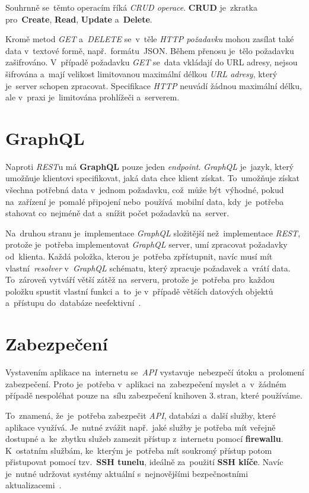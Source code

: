 \documentclass[11pt,a4paper]{report}
\begin{document}
            Souhrnně se~těmto operacím říká \emph{CRUD operace}. \textbf{CRUD} je~zkratka pro~\textbf{Create}, \textbf{Read}, \textbf{Update} a~\textbf{Delete}.

            Kromě metod \emph{GET} a~\emph{DELETE} se~v~těle \emph{HTTP požadavku} mohou zasílat také data v~textové formě, např.~formátu~JSON. Během přenosu je~tělo požadavku zašifrováno. V~případě požadavku \emph{GET} se~data vkládají do URL adresy, nejsou šifrována a~mají velikost limitovanou maximální délkou \emph{URL adresy}, který je~server schopen zpracovat. Specifikace \emph{HTTP} neuvádí žádnou maximální délku, ale v~praxi je~limitována prohlížeči a~serverem. \cite[3.2.1]{ietf-httpbis-messaging-03}

        \section{GraphQL}
            Naproti \emph{REST}u má \textbf{GraphQL} pouze jeden \emph{endpoint}. \emph{GraphQL} je~jazyk, který umožňuje klientovi specifikovat, jaká data chce klient získat. To~umožňuje získat všechna potřebná data v~jednom požadavku, což~může být~výhodné, pokud na~zařízení je~pomalé připojení nebo~používá~mobilní data, kdy~je~potřeba stahovat co~nejméně dat a~snížit počet požadavků na~server.

            Na~druhou stranu je~implementace \emph{GraphQL} složitější než~implementace \emph{REST}, protože je~potřeba implementovat \emph{GraphQL} server, umí zpracovat požadavky od~klienta. Každá položka, kterou je~potřeba zpřístupnit, navíc musí mít vlastní~\emph{resolver} v~\emph{GraphQL} schématu, který zpracuje požadavek a~vrátí data. To~zároveň vytváří větší zátěž na~serveru, protože je~potřeba pro~každou položku spustit vlastní funkci a~to~je v~případě větších datových objektů a~přístupu do~databáze neefektivní~\cite{Herrera:restgraphql, Dorman:webmappingajax}.

        \section{Zabezpečení}
            Vystavením aplikace na~internetu se~\emph{API} vystavuje~nebezpečí útoku a~prolomení zabezpečení. Proto je~potřeba v~aplikaci na~zabezpečení myslet a~v~žádném případě nespoléhat pouze na~sílu zabezpečení knihoven 3.\,stran, které používáme.
            
            To~znamená, že~je~potřeba zabezpečit \emph{API}, databázi a~další služby, které aplikace využívá. Je~nutné zvážit např.~jaké služby je potřeba mít veřejně dostupné a~ke~zbytku služeb zamezit přístup z~internetu pomocí \textbf{firewallu}. K~ostatním službám, ke~kterým je~potřeba mít soukromý přístup potom přistupovat pomocí tzv.~\textbf{SSH tunelu}, ideálně za~použití \textbf{SSH klíče}. Navíc je~nutné udržovat systémy aktuální s~nejnovějšími bezpečnostními aktualizacemi~\cite{graham2021ethical, Dorman:webmappingajax}.
            
\end{document}
